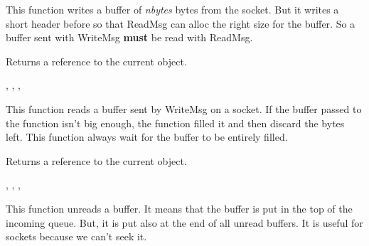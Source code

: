 
This function writes a buffer of {\it nbytes} bytes from the socket. But it
writes a short header before so that ReadMsg can alloc the right size for
the buffer. So a buffer sent with WriteMsg {\bf must} be read with ReadMsg.



Returns a reference to the current object.


,
,
,

%
%

\label{wxsocketbasereadmsg}


This function reads a buffer sent by WriteMsg on a socket. If the buffer passed
to the function isn't big enough, the function filled it and then discard the
bytes left. This function always wait for the buffer to be entirely filled.



Returns a reference to the current object.


,
,
,

%
%

\label{wxsocketbaseunread}


This function unreads a buffer. It means that the buffer is put in the top
of the incoming queue. But, it is put also at the end of all unread buffers.
It is useful for sockets because we can't seek it.

